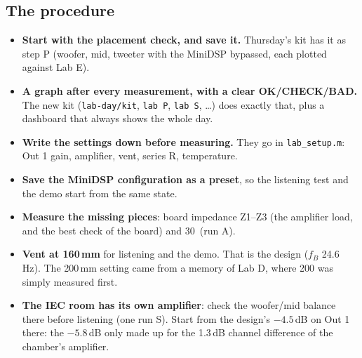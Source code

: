 \documentclass[11pt,a4paper]{article}
\begin{document}
\subsection*{The procedure}
\begin{itemize}[leftmargin=*]
\item \textbf{Start with the placement check, and save it.} Thursday's kit has it as step P (woofer, mid,
tweeter with the MiniDSP bypassed, each plotted against Lab E).
\item \textbf{A graph after every measurement, with a clear OK/CHECK/BAD.} The new kit (\texttt{lab-day/kit},
\texttt{lab P}, \texttt{lab S}, \dots) does exactly that, plus a dashboard that always shows the whole day.
\item \textbf{Write the settings down before measuring.} They go in \texttt{lab\_setup.m}: Out 1 gain, amplifier, vent, series R, temperature.
\item \textbf{Save the MiniDSP configuration as a preset}, so the listening test and the demo start from the same state.
\item \textbf{Measure the missing pieces}: board impedance Z1--Z3 (the amplifier load, and the best check of
the board) and 30\textdegree\ (run A).
\item \textbf{Vent at 160\,mm} for listening and the demo. That is the design ($f_B$ 24.6\,Hz). The 200\,mm setting came from a
memory of Lab D, where 200 was simply measured first.
\item \textbf{The IEC room has its own amplifier}: check the woofer/mid balance there before listening
(one run S). Start from the design's $-4.5$\,dB on Out 1 there: the $-5.8$\,dB only made up for the
1.3\,dB channel difference of the chamber's amplifier.
\end{itemize}
\end{document}
